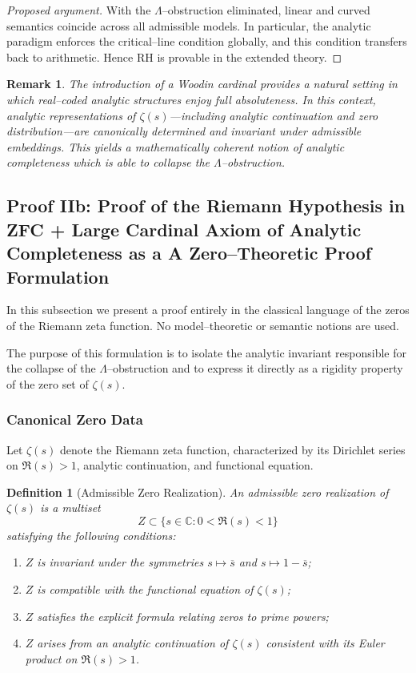 \documentclass{article}
\newtheorem{definition}[theorem]{Definition}
\newtheorem{remark}[theorem]{Remark}
\theoremstyle{definition}
\begin{document}
\begin{proof}[Proposed argument]
With the $\Lambda$--obstruction eliminated, linear and curved semantics coincide
across all admissible models. In particular, the analytic paradigm enforces the
critical--line condition globally, and this condition transfers back to
arithmetic. Hence RH is provable in the extended theory.
\end{proof}

\begin{remark}
The introduction of a Woodin cardinal provides a natural setting in which
real--coded analytic structures enjoy full absoluteness.
In this context, analytic representations of $\zeta(s)$—including analytic
continuation and zero distribution—are canonically determined and invariant
under admissible embeddings.
This yields a mathematically coherent notion of analytic completeness which is able to collapse the $\Lambda$--obstruction.
\end{remark}

\subsection{Proof IIb: Proof of the Riemann Hypothesis in ZFC + Large Cardinal Axiom of Analytic Completeness as a A Zero--Theoretic Proof Formulation}

In this subsection we present a proof entirely in the classical language of
the zeros of the Riemann zeta function. No model--theoretic or semantic notions are used.

The purpose of this formulation is to isolate the analytic invariant
responsible for the collapse of the $\Lambda$--obstruction and to express
it directly as a rigidity property of the zero set of $\zeta(s)$.

\subsubsection{Canonical Zero Data}

Let $\zeta(s)$ denote the Riemann zeta function, characterized by its
Dirichlet series on $\Re(s)>1$, analytic continuation, and functional
equation.

\begin{definition}[Admissible Zero Realization]
An \emph{admissible zero realization} of $\zeta(s)$ is a multiset
\[
Z \subset \{ s \in \mathbb{C} : 0 < \Re(s) < 1 \}
\]
satisfying the following conditions:
\begin{enumerate}
\item $Z$ is invariant under the symmetries
      $s \mapsto \overline{s}$ and $s \mapsto 1-\overline{s}$;
\item $Z$ is compatible with the functional equation of $\zeta(s)$;
\item $Z$ satisfies the explicit formula relating zeros to prime powers;
\item $Z$ arises from an analytic continuation of $\zeta(s)$ consistent
      with its Euler product on $\Re(s)>1$.
\end{enumerate}
\end{definition}
\end{document}

